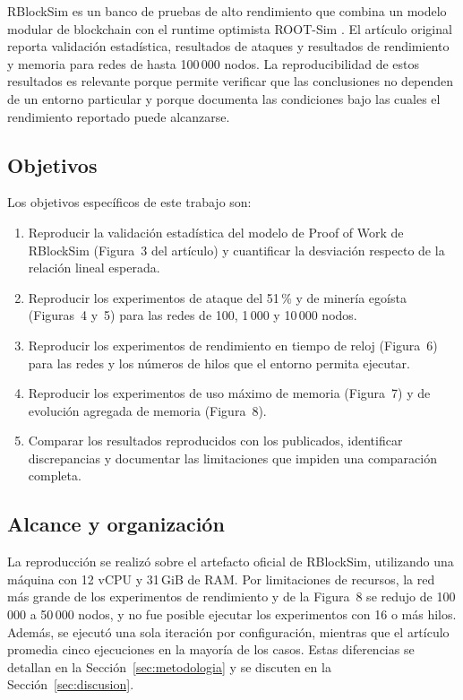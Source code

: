 \documentclass[11pt,a4paper,oneside]{article}
\begin{document}
RBlockSim \cite{pimpini2025rblocksim} es un banco de pruebas de alto rendimiento que combina un modelo modular de blockchain con el runtime optimista ROOT-Sim \cite{pellegrini2012rootsim}. El artículo original reporta validación estadística, resultados de ataques y resultados de rendimiento y memoria para redes de hasta 100\,000 nodos. La reproducibilidad de estos resultados es relevante porque permite verificar que las conclusiones no dependen de un entorno particular y porque documenta las condiciones bajo las cuales el rendimiento reportado puede alcanzarse.

\subsection{Objetivos}

Los objetivos específicos de este trabajo son:

\begin{enumerate}
  \item Reproducir la validación estadística del modelo de Proof of Work de RBlockSim (Figura~3 del artículo) y cuantificar la desviación respecto de la relación lineal esperada.
  \item Reproducir los experimentos de ataque del 51\,\% y de minería egoísta (Figuras~4 y~5) para las redes de 100, 1\,000 y 10\,000 nodos.
  \item Reproducir los experimentos de rendimiento en tiempo de reloj (Figura~6) para las redes y los números de hilos que el entorno permita ejecutar.
  \item Reproducir los experimentos de uso máximo de memoria (Figura~7) y de evolución agregada de memoria (Figura~8).
  \item Comparar los resultados reproducidos con los publicados, identificar discrepancias y documentar las limitaciones que impiden una comparación completa.
\end{enumerate}

\subsection{Alcance y organización}

La reproducción se realizó sobre el artefacto oficial de RBlockSim, utilizando una máquina con 12 vCPU y 31\,GiB de RAM. Por limitaciones de recursos, la red más grande de los experimentos de rendimiento y de la Figura~8 se redujo de 100\,000 a 50\,000 nodos, y no fue posible ejecutar los experimentos con 16 o más hilos. Además, se ejecutó una sola iteración por configuración, mientras que el artículo promedia cinco ejecuciones en la mayoría de los casos. Estas diferencias se detallan en la Sección~\ref{sec:metodologia} y se discuten en la Sección~\ref{sec:discusion}.
\end{document}
